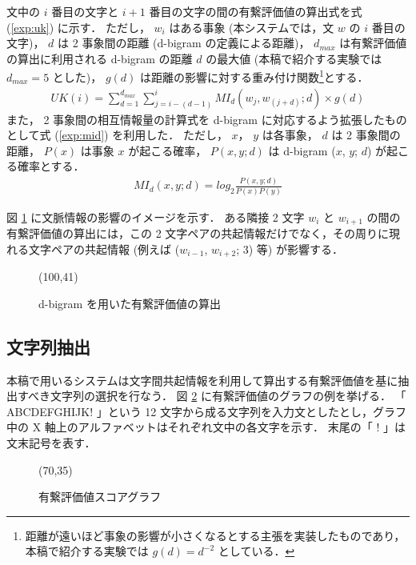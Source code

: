 文中の $i$ 番目の文字と $i+1$ 番目の文字の間の有繋評価値の算出式を式 (\ref{exp:uk}) に示す．
ただし， $w_i$ はある事象 (本システムでは，文 $w$ の $i$ 番目の文字)， $d$ は 2 事象間の距離 (d-bigram の定義による距離)， $d_{max}$ は有繋評価値の算出に利用される d-bigram の距離 $d$ の最大値 (本稿で紹介する実験では $d_{max} = 5$ とした)， $g(d)$ は距離の影響に対する重み付け関数\footnote{距離が遠いほど事象の影響が小さくなるとする主張\cite{church89acl}を実装したものであり，本稿で紹介する実験では $g(d) = d^{-2}$\cite{sano96} としている．}とする．
\begin{eqnarray}\label{exp:uk}
UK(i) = \sum_{d=1}^{d_{max}}\sum_{j=i-(d-1)}^{i} MI_d(w_j,w_{(j+d)};d) \times g(d)
\end{eqnarray}
また， 2 事象間の相互情報量の計算式を d-bigram に対応するよう拡張したものとして式 (\ref{exp:mid}) を利用した．
ただし， $x$， $y$ は各事象， $d$ は 2 事象間の距離， $P(x)$ は事象 $x$ が起こる確率， $P(x,y;d)$ は d-bigram ($x$, $y$; $d$) が起こる確率とする．
\begin{eqnarray}\label{exp:mid}
MI_d(x,y;d) = log_2\frac{P(x,y;d)}{P(x)P(y)}
\end{eqnarray}

図 \ref{fig:scoring} に文脈情報の影響のイメージを示す．
ある隣接 2 文字 $w_i$ と $w_{i+1}$ の間の有繋評価値の算出には，この 2 文字ペアの共起情報だけでなく，その周りに現れる文字ペアの共起情報 (例えば ($w_{i-1}$, $w_{i+2}$; 3) 等) が影響する．
\begin{figure}[htb]
\begin{minipage}{\textwidth}
\begin{center}

\atari(100,41)

\caption{d-bigram を用いた有繋評価値の算出\cite{nobesawa96coling}}
\label{fig:scoring}
\end{center}
\end{minipage}
\end{figure}

\vspace*{5mm}

\subsection{文字列抽出}
本稿で用いるシステムは文字間共起情報を利用して算出する有繋評価値を基に抽出すべき文字列の選択を行なう．
図 \ref{fig:scoregraph} に有繋評価値のグラフの例を挙げる．
「 ABCDEFGHIJK! 」という 12 文字から成る文字列を入力文としたとし，グラフ中の X 軸上のアルファベットはそれぞれ文中の各文字を示す．
末尾の「 ! 」は文末記号を表す．
\begin{figure}[htb]
\begin{minipage}{\textwidth}
\begin{center}

\atari(70,35)

\caption{有繋評価値スコアグラフ\cite{nobesawa96coling}}
\label{fig:scoregraph}
\end{center}
\end{minipage}
\end{figure}

